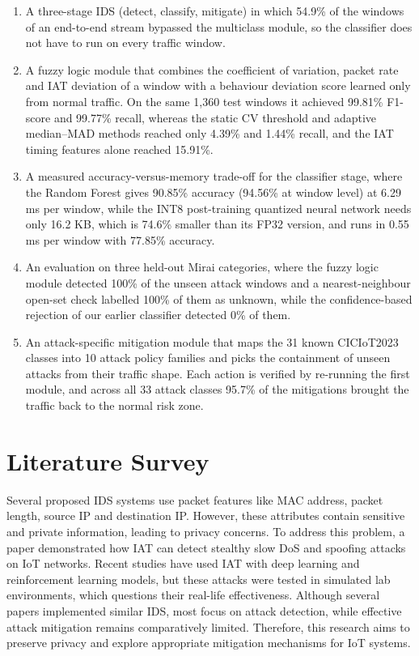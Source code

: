 \documentclass[]{interact}
\theoremstyle{plain}%
\theoremstyle{definition}
\theoremstyle{remark}
\begin{document}
\begin{enumerate}
\item A three-stage IDS (detect, classify, mitigate) in which 54.9\% of the windows of an end-to-end stream bypassed the multiclass module, so the classifier does not have to run on every traffic window.
\item A fuzzy logic module that combines the coefficient of variation, packet rate and IAT deviation of a window with a behaviour deviation score learned only from normal traffic. On the same 1,360 test windows it achieved 99.81\% F1-score and 99.77\% recall, whereas the static CV threshold and adaptive median--MAD methods reached only 4.39\% and 1.44\% recall, and the IAT timing features alone reached 15.91\%.
\item A measured accuracy-versus-memory trade-off for the classifier stage, where the Random Forest gives 90.85\% accuracy (94.56\% at window level) at 6.29 ms per window, while the INT8 post-training quantized neural network needs only 16.2 KB, which is 74.6\% smaller than its FP32 version, and runs in 0.55 ms per window with 77.85\% accuracy.
\item An evaluation on three held-out Mirai categories, where the fuzzy logic module detected 100\% of the unseen attack windows and a nearest-neighbour open-set check labelled 100\% of them as unknown, while the confidence-based rejection of our earlier classifier detected 0\% of them.
\item An attack-specific mitigation module that maps the 31 known CICIoT2023 classes into 10 attack policy families and picks the containment of unseen attacks from their traffic shape. Each action is verified by re-running the first module, and across all 33 attack classes 95.7\% of the mitigations brought the traffic back to the normal risk zone.
\end{enumerate}


\section{Literature Survey}
Several proposed IDS systems use packet features like MAC address, packet length, source IP and destination IP\cite{ppdowdaorsuttf2026}. However, these attributes contain sensitive and private information, leading to privacy concerns. To address this problem, a paper demonstrated how IAT can detect stealthy slow DoS and spoofing attacks on IoT networks. Recent studies have used IAT with deep learning and reinforcement learning models, but these attacks were tested in simulated lab environments, which questions their real-life effectiveness. Although several papers implemented similar IDS, most focus on attack detection, while effective attack mitigation remains comparatively limited. Therefore, this research aims to preserve privacy and explore appropriate mitigation mechanisms for IoT systems.
\end{document}
